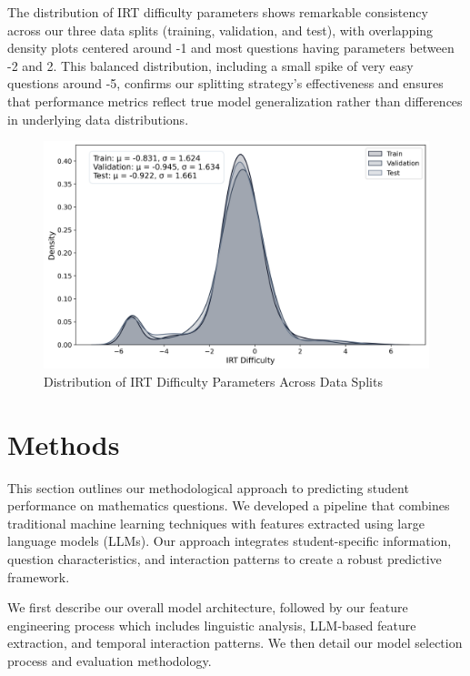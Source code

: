 \documentclass[
    a4paper, %
    10pt, %
    twoside, %
]{LTJournalArticle}
\begin{document}
The distribution of IRT difficulty parameters shows remarkable consistency across our three data splits (training, validation, and test), with overlapping density plots centered around -1 and most questions having parameters between -2 and 2. This balanced distribution, including a small spike of very easy questions around -5, confirms our splitting strategy's effectiveness and ensures that performance metrics reflect true model generalization rather than differences in underlying data distributions.

\begin{figure}[H]
    \centering
    \includegraphics[width=\columnwidth]{../one_model_experiment/figures/difficulty_distribution.png}
    \caption{Distribution of IRT Difficulty Parameters Across Data Splits}
    \label{fig:difficulty-dist}
\end{figure}




\section{Methods}

This section outlines our methodological approach to predicting student performance on mathematics questions. We developed a pipeline that combines traditional machine learning techniques with features extracted using large language models (LLMs). Our approach integrates student-specific information, question characteristics, and interaction patterns to create a robust predictive framework.

We first describe our overall model architecture, followed by our feature engineering process which includes linguistic analysis, LLM-based feature extraction, and temporal interaction patterns. We then detail our model selection process and evaluation methodology.
\end{document}
